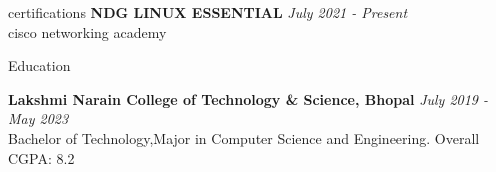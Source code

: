 \documentclass{resume} %
\begin{document}
    

\begin{rSection}{certifications}
    {\bf NDG LINUX ESSENTIAL} \hfill {\em July 2021 - Present} 
    \\ {cisco networking academy} 
    \\
\end{rSection} 



\begin{rSection}{Education}

    
    {\bf Lakshmi Narain College of Technology \& Science, Bhopal} \hfill {\em July 2019 - May 2023} 
    \\ Bachelor of Technology,Major in Computer Science and Engineering.\hfill { Overall CGPA: 8.2 }
    
    
    
    
    
    
    
    \end{rSection}
    
    


\end{document}
